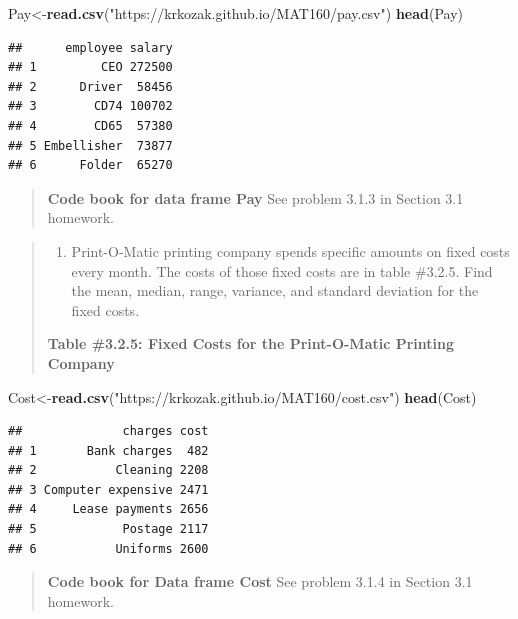 \documentclass[]{book}
\newenvironment{Shaded}{\begin{snugshade}}{\end{snugshade}}
\newcommand{\KeywordTok}[1]{\textcolor[rgb]{0.13,0.29,0.53}{\textbf{#1}}}
\newcommand{\NormalTok}[1]{#1}
\newcommand{\StringTok}[1]{\textcolor[rgb]{0.31,0.60,0.02}{#1}}
\providecommand{\tightlist}{%
  \setlength{\itemsep}{0pt}\setlength{\parskip}{0pt}}
\begin{document}
\begin{Shaded}
\begin{Highlighting}[]
\NormalTok{Pay<-}\KeywordTok{read.csv}\NormalTok{(}\StringTok{"https://krkozak.github.io/MAT160/pay.csv"}\NormalTok{)}
\KeywordTok{head}\NormalTok{(Pay)}
\end{Highlighting}
\end{Shaded}

\begin{verbatim}
##      employee salary
## 1         CEO 272500
## 2      Driver  58456
## 3        CD74 100702
## 4        CD65  57380
## 5 Embellisher  73877
## 6      Folder  65270
\end{verbatim}

\begin{quote}
\textbf{Code book for data frame Pay} See problem 3.1.3 in Section 3.1 homework.
\end{quote}

\begin{quote}
\begin{enumerate}
\def\labelenumi{\arabic{enumi}.}
\setcounter{enumi}{3}
\tightlist
\item
  Print-O-Matic printing company spends specific amounts on fixed costs every month. The costs of those fixed costs are in table \#3.2.5. Find the mean, median, range, variance, and standard deviation for the fixed costs.
\end{enumerate}

\textbf{Table \#3.2.5: Fixed Costs for the Print-O-Matic Printing Company}
\end{quote}

\begin{Shaded}
\begin{Highlighting}[]
\NormalTok{Cost<-}\KeywordTok{read.csv}\NormalTok{(}\StringTok{"https://krkozak.github.io/MAT160/cost.csv"}\NormalTok{)}
\KeywordTok{head}\NormalTok{(Cost)}
\end{Highlighting}
\end{Shaded}

\begin{verbatim}
##              charges cost
## 1       Bank charges  482
## 2           Cleaning 2208
## 3 Computer expensive 2471
## 4     Lease payments 2656
## 5            Postage 2117
## 6           Uniforms 2600
\end{verbatim}

\begin{quote}
\textbf{Code book for Data frame Cost} See problem 3.1.4 in Section 3.1 homework.
\end{quote}
\end{document}

